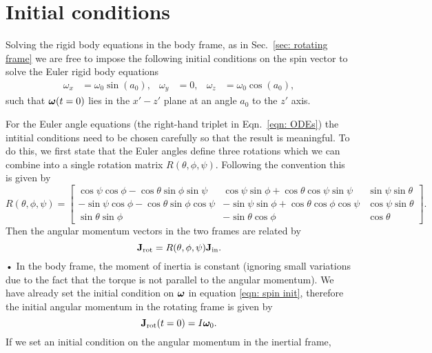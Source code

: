 \documentclass[../full_thesis/full_thesis.tex]{subfiles}
\begin{document}
\section{Initial conditions}

Solving the rigid body equations in the body frame, as in Sec.~\ref{sec:
rotating frame} we are free to impose the following initial conditions on the
spin vector to solve the Euler rigid body equations
\begin{align}\label{eqn: spin init}
\omega_{x} & = \omega_{0}\sin(a_{0}), &
\omega_{y} & = 0, &
\omega_{z} & = \omega_{0}\cos(a_{0}),
\end{align}
such that $\boldsymbol{\omega}(t=0)$ lies in the $x' - z'$ plane at an angle $a_{0}$ to the
$z'$ axis.

For the Euler angle equations (the right-hand triplet in Eqn.~\eqref{eqn:
ODEs}) the intitial conditions need to be chosen carefully so that the result
is meaningful. To do this, we first state that the Euler angles define three
rotations which we can combine into a single rotation matrix $R(\theta, \phi,
\psi)$. Following the \citet{Landau1969} convention this is given by
\begin{equation}
R(\theta, \phi, \psi) = \left[
\begin{array}{ccc}
\cos\psi \cos\phi - \cos\theta \sin\phi \sin \psi &
\cos\psi \sin \phi + \cos\theta \cos \psi \sin \psi &
\sin \psi \sin\theta \\
-\sin\psi \cos\phi - \cos\theta\sin\phi\cos\psi &
-\sin\psi\sin\phi + \cos\theta\cos\phi\cos\psi &
\cos\psi \sin\theta \\
\sin\theta\sin\phi &
-\sin\theta \cos\phi &
\cos\theta
\end{array}
\right].
\label{eqn: rotation matrix}
\end{equation}
Then the angular momentum vectors in the two frames are related by
\begin{equation}
\mathbf{J}_{\textrm{rot}} = R(\theta, \phi, \psi) \mathbf{J}_{\textrm{in}} .
\label{eqn: transform}
\end{equation}•
In the body frame, the moment of inertia is constant (ignoring small variations
due to the fact that the torque is not parallel to the angular momentum).
We have already set the initial condition on $\boldsymbol{\omega}$  in equation \eqref{eqn:
spin init}, therefore the initial angular momentum in the rotating frame is given by
\begin{equation}
  \mathbf{J}_{\textrm{rot}}(t=0) = I \boldsymbol{\omega}_0.
\end{equation}
If we set an initial condition on the angular momentum in the inertial frame,
\end{document}
